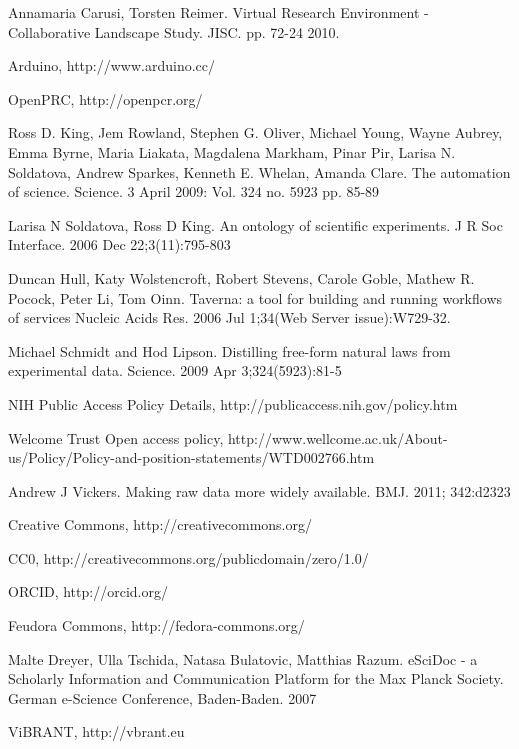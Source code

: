 \documentclass{llncs}
\begin{document}
%
%
\begin{thebibliography}{5}
%
 Annamaria Carusi, Torsten Reimer. Virtual Research
  Environment - Collaborative Landscape Study. JISC. pp. 72-24 2010.

 Arduino, http://www.arduino.cc/

 OpenPRC, http://openpcr.org/

 Ross D. King, Jem Rowland, Stephen G. Oliver, Michael
  Young, Wayne Aubrey, Emma Byrne, Maria Liakata, Magdalena Markham,
  Pinar Pir, Larisa N. Soldatova, Andrew Sparkes, Kenneth E. Whelan,
  Amanda Clare. The automation of science. Science. 3 April 2009:
  Vol. 324 no. 5923 pp. 85-89

 Larisa N Soldatova, Ross D King. An ontology of
  scientific experiments. J R Soc Interface. 2006 Dec 22;3(11):795-803

 Duncan Hull, Katy Wolstencroft, Robert Stevens, Carole
  Goble, Mathew R. Pocock, Peter Li, Tom Oinn. Taverna: a tool for
  building and running workflows of services Nucleic Acids Res. 2006
  Jul 1;34(Web Server issue):W729-32.

 Michael Schmidt and Hod Lipson. Distilling free-form
  natural laws from experimental data.  Science. 2009 Apr
  3;324(5923):81-5

 NIH Public Access Policy Details,
  http://publicaccess.nih.gov/policy.htm

 Welcome Trust Open access policy,
  http://www.wellcome.ac.uk/About-us/Policy/Policy-and-position-statements/WTD002766.htm

 Andrew J Vickers. Making raw data more widely
  available. BMJ. 2011; 342:d2323

 Creative Commons, http://creativecommons.org/

 CC0, http://creativecommons.org/publicdomain/zero/1.0/

 ORCID, http://orcid.org/

 Feudora Commons, http://fedora-commons.org/

 Malte Dreyer, Ulla Tschida, Natasa Bulatovic, Matthias
  Razum. eSciDoc - a Scholarly Information and Communication Platform
  for the Max Planck Society. German e-Science Conference,
  Baden-Baden. 2007

 ViBRANT, http://vbrant.eu


\end{thebibliography}
\end{document}
